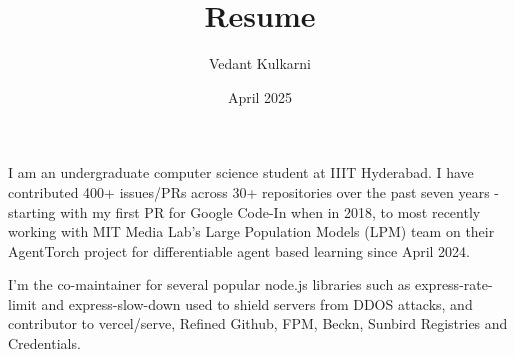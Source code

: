 \documentclass{resume}
\title{Resume}
\author{Vedant Kulkarni}
\date{April 2025}
\begin{document}

\begin{multicols}{2}

    \columnbreak
    \begin{spacing}{1.2} {\small
        I am an undergraduate computer science student at IIIT Hyderabad. I have contributed 400+ issues/PRs across 30+ repositories over the past seven years - starting with my first PR for Google Code-In when in 2018, to most recently working with MIT Media Lab’s Large Population Models (LPM) team on their AgentTorch project for differentiable agent based learning since April 2024.

        I’m the co-maintainer for several popular node.js libraries such as express-rate-limit and express-slow-down used to shield servers from DDOS attacks, and contributor to vercel/serve, Refined Github, FPM, Beckn, Sunbird Registries and Credentials.
    } \end{spacing}
\end{multicols}

\vspace{1em}
\setlength{\columnsep}{1cm}
\end{document}
